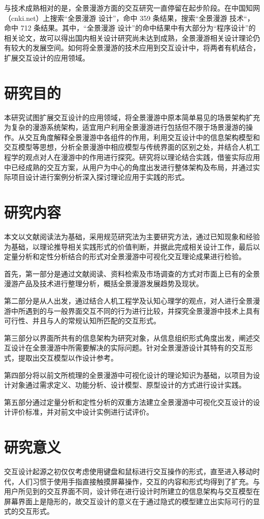 与技术成熟相对的是，全景漫游方面的交互研究一直停留在起步阶段。在中国知网（cnki.net）上搜索“全景漫游 设计”，命中 359 条结果，搜索“全景漫游 技术“，命中 712 条结果。其中，“全景漫游 设计”的命中结果中有大部分为“程序设计”的相关论文，故可以得出国内相关设计研究尚未达到成熟，全景漫游相关设计理论仍有较大的发展空间。如何将全景漫游的技术应用到交互设计中，将两者有机结合，扩展交互设计的应用领域。

\section{研究目的}
本研究试图扩展交互设计的应用领域，将全景漫游中原本简单易见的场景架构扩充为复杂的漫游系统架构，适宜用户利用全景漫游进行包括但不限于场景漫游的操作。从交互角度解释全景漫游中各组件的作用，利用交互设计中的信息架构模型和交互模型等思想，分析全景漫游中相应模型与传统界面的区别之处，并结合人机工程学的观点对人在漫游中的作用进行探究。研究将以理论结合实践，借鉴实际应用中已经成熟的交互方案，从用户为中心的角度出发进行整体架构及布局，并通过实际项目设计进行案例分析深入探讨理论应用于实践的形式。

\section{研究内容}
本文以文献阅读法为基础，采用规范研究法为主要研究方法，通过已知现象和经验为基础，以理论推导相关实践形式的价值判断，并据此完成相关设计工作，最后以定量分析和定性分析结合的形式对全景漫游中可视化交互理论成果进行检验。

首先，第一部分是通过文献阅读、资料检索及市场调查的方式对市面上已有的全景漫游产品及技术进行整理分析，概括全景漫游发展趋势及现状。

第二部分是从人出发，通过结合人机工程学及认知心理学的观点，对人进行全景漫游中所遇到的与一般界面交互不同的行为进行比较，并探究全景漫游中技术上具有可行性、并且与人的常规认知所匹配的交互形式。

第三部分以界面所共有的信息架构为研究对象，从信息组织形式角度出发，阐述交互设计在全景漫游中所需要解决的实际问题。针对全景漫游设计其特有的交互形式，提取出交互模型以作设计参考。

第四部分将以前文所梳理的全景漫游中可视化设计的理论知识为基础，以项目为设计对象通过需求定义、功能分析、设计模型、原型设计的方式进行设计实践。

第五部分通过定量分析和定性分析的双重方法建立全景漫游中可视化交互设计的设计评价标准，并对前文中设计实例进行试评价。

\section{研究意义}
交互设计起源之初仅仅考虑使用键盘和鼠标进行交互操作的形式，直至进入移动时代，人们习惯于使用手指直接触摸屏幕操作，交互的内容和形式均得到了扩充。与用户所见到的交互界面不同，设计师在进行设计时所建立的信息架构与交互模型在屏幕界面上是隐形的，故交互设计的意义在于通过隐式的模型建立出实际可行的显式的交互形式。

